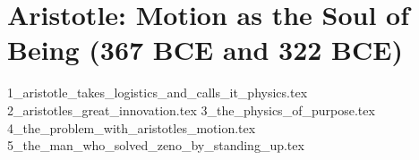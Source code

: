 \section{Aristotle: Motion as the Soul of Being (367 BCE and 322 BCE)}  

{1_aristotle_takes_logistics_and_calls_it_physics.tex}
{2_aristotles_great_innovation.tex}
{3_the_physics_of_purpose.tex}
{4_the_problem_with_aristotles_motion.tex}
{5_the_man_who_solved_zeno_by_standing_up.tex}